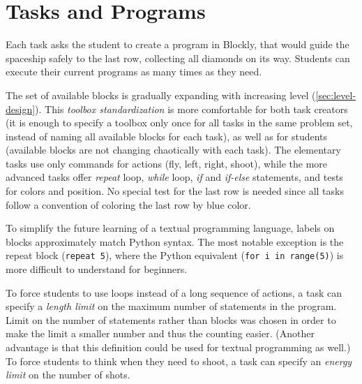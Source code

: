 \section{Tasks and Programs}
\label{sec:robomission.programs}

Each task asks the student to create a program in Blockly,
that would guide the spaceship safely to the last row,
collecting all diamonds on its way. %
Students can execute their current programs as many times
as they need. %

The set of available blocks is gradually expanding with
increasing level (\cref{sec:level-design}). This \emph{toolbox standardization}
is more comfortable for both task creators (it is enough to specify
a toolbox only once for all tasks in the same problem set,
instead of naming all available blocks for each task),
as well as for students
(available blocks are not changing chaotically with each task).
The elementary tasks use only commands for actions (fly, left, right, shoot),
while the more advanced tasks offer \emph{repeat} loop, \emph{while} loop,
\emph{if} and \emph{if-else} statements,
and tests for colors and position.
No special test for the last row is needed since all tasks follow a convention
of coloring the last row by blue color.

To simplify the future learning of a textual programming language,
labels on blocks approximately match Python syntax. %
The most notable exception is the repeat block (\texttt{repeat 5}),
where the Python equivalent (\texttt{for i in range(5)}) is more difficult
to understand for beginners.

To force students to use loops instead of a long sequence of actions,
a task can specify a \emph{length limit}
on the maximum number of statements in the program.
Limit on the number of statements rather than blocks was chosen in
order to make the limit a smaller number and thus the counting easier.
(Another advantage is that this definition could be used for textual
programming as well.)
To force students to think when they need to shoot, a task can specify
an \emph{energy limit} on the number of shots.

